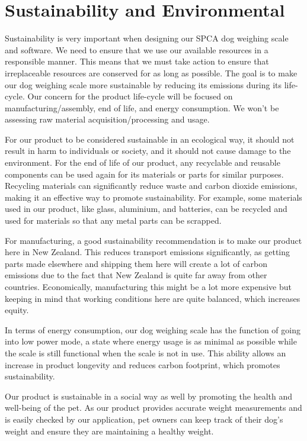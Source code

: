 \section{Sustainability and Environmental}

Sustainability is very important when designing our SPCA dog weighing scale and software. We need to ensure that we use our available resources in a responsible manner. This means that we must take action to ensure that irreplaceable resources are conserved for as long as possible. The goal is to make our dog weighing scale more sustainable by reducing its emissions during its life-cycle. Our concern for the product life-cycle will be focused on manufacturing/assembly, end of life, and energy consumption. We won’t be assessing raw material acquisition/processing and usage.

For our product to be considered sustainable in an ecological way, it should not result in harm to individuals or society, and it should not cause damage to the environment. For the end of life of our product, any recyclable and reusable components can be used again for its materials or parts for similar purposes. Recycling materials can significantly reduce waste and carbon dioxide emissions, making it an effective way to promote sustainability. For example, some materials used in our product, like glass, aluminium, and batteries, can be recycled and used for materials so that any metal parts can be scrapped.

For manufacturing, a good sustainability recommendation is to make our product here in New Zealand. This reduces transport emissions significantly, as getting parts made elsewhere and shipping them here will create a lot of carbon emissions due to the fact that New Zealand is quite far away from other countries. Economically, manufacturing this might be a lot more expensive but keeping in mind that working conditions here are quite balanced, which increases equity.

In terms of energy consumption, our dog weighing scale has the function of going into low power mode, a state where energy usage is as minimal as possible while the scale is still functional when the scale is not in use. This ability allows an increase in product longevity and reduces carbon footprint, which promotes sustainability.

Our product is sustainable in a social way as well by promoting the health and well-being of the pet. As our product provides accurate weight measurements and is easily checked by our application,  pet owners can keep track of their dog’s weight and ensure they are maintaining a healthy weight.

